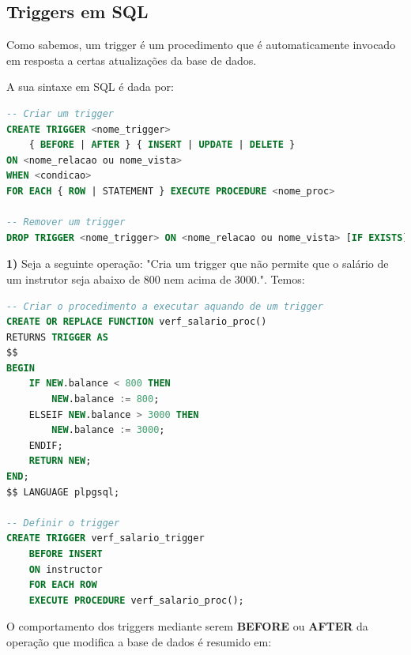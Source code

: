 \documentclass[oneside]{book}
\theoremstyle{definition}
\begin{document}
\subsection{Triggers em SQL}
Como sabemos, um trigger é um procedimento que é automaticamente invocado em resposta a certas atualizações da base de dados.

A sua sintaxe em SQL é dada por:

\begin{lstlisting}[language=SQL, morekeywords={TRIGGER, BEFORE, AFTER, FOR, EACH, ROW, STATEMENT, PROCEDURE, IF}, framesep=8pt, xleftmargin=40pt, framexleftmargin=40pt, frame=tb, framerule=0pt]
-- Criar um trigger
CREATE TRIGGER <nome_trigger>
    { BEFORE | AFTER } { INSERT | UPDATE | DELETE }
ON <nome_relacao ou nome_vista>
WHEN <condicao>
FOR EACH { ROW | STATEMENT } EXECUTE PROCEDURE <nome_proc>

-- Remover um trigger
DROP TRIGGER <nome_trigger> ON <nome_relacao ou nome_vista> [IF EXISTS]
\end{lstlisting}

\textbf{1)} Seja a seguinte operação: "Cria um trigger que não permite que o salário de um instrutor seja abaixo de 800 nem acima de 3000.". Temos:

\begin{lstlisting}[language=SQL, morekeywords={TRIGGER, REPLACE, FUNCTION, RETURNS, $$, IF, NEW, ELSEIF, ENDIF, RETURN, NEW, LANGUAGE, AFTER, FOR, EACH, ROW, PROCEDURE, BEFORE}, framesep=8pt, xleftmargin=40pt, framexleftmargin=40pt, frame=tb, framerule=0pt]
-- Criar o procedimento a executar aquando de um trigger
CREATE OR REPLACE FUNCTION verf_salario_proc()
RETURNS TRIGGER AS
$$
BEGIN
    IF NEW.balance < 800 THEN
        NEW.balance := 800;
    ELSEIF NEW.balance > 3000 THEN 
        NEW.balance := 3000;
    ENDIF;
    RETURN NEW;
END;
$$ LANGUAGE plpgsql;

-- Definir o trigger
CREATE TRIGGER verf_salario_trigger
    BEFORE INSERT
    ON instructor
    FOR EACH ROW
    EXECUTE PROCEDURE verf_salario_proc();
\end{lstlisting}

O comportamento dos triggers mediante serem \textbf{BEFORE} ou \textbf{AFTER} da operação que modifica a base de dados é resumido em:
\end{document}
